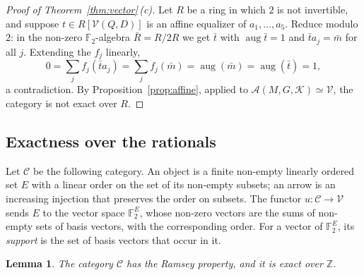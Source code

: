 \documentclass[11pt,a4paper]{article}
\newtheorem{lemma}[theorem]{Lemma}
\theoremstyle{definition}
\newcommand{\A}{\mathcal{A}}
\newcommand{\K}{\mathcal{K}}
\newcommand{\C}{\mathcal{C}}
\newcommand{\V}{\mathcal{V}}
\newcommand{\Z}{\mathbb{Z}}
\newcommand{\F}{\mathbb{F}}
\newcommand{\aug}{\operatorname{aug}}
\begin{document}
\begin{proof}[Proof of Theorem~\ref{thm:vector}\,\textup{(c)}]
Let $R$ be a ring in which $2$ is not invertible, and suppose
$t\in R[\V(Q,D)]$ is an affine equalizer of $a_1,\dots,a_5$. Reduce modulo
$2$: in the non-zero $\F_2$-algebra $\bar R=R/2R$ we get $\bar t$ with
$\aug\bar t=1$ and $\bar ta_j=\bar m$ for all $j$. Extending the $f_j$
linearly,
\[
 0=\sum_jf_j(\bar ta_j)=\sum_jf_j(\bar m)=\aug(\bar m)=\aug(\bar t)=1 ,
\]
a contradiction. By Proposition~\ref{prop:affine}, applied to
$\A(M,G,\K)\simeq\V$, the category is not exact over $R$.
\end{proof}

\subsection{Exactness over the rationals}

Let $\C$ be the following category. An object is a finite non-empty linearly
ordered set $E$ with a linear order on the set of its non-empty subsets; an
arrow is an increasing injection that preserves the order on subsets. The
functor $u\colon\C\to\V$ sends $E$ to the vector space $\F_2^E$, whose
non-zero vectors are the sums of non-empty sets of basis vectors, with the
corresponding order. For a vector of $\F_2^E$, its \emph{support} is the set
of basis vectors that occur in it.

\begin{lemma}\label{lem:C}
The category $\C$ has the Ramsey property, and it is exact over $\Z$.
\end{lemma}
\end{document}
